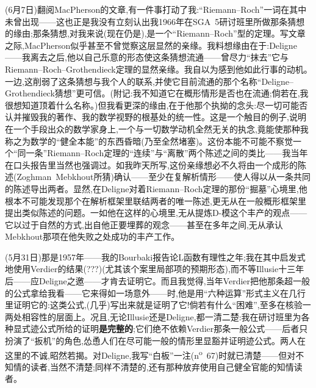 (6月7日)翻阅MacPherson的文章,有一件事打动了我:“Riemann--Roch”一词在其中未曾出现——这也正是我没有立刻认出我1966年在SGA~5研讨班里所做那条猜想的缘由;那条猜想,对我来说(现在仍是),是一个“Riemann--Roch”型的定理。写文章之际,MacPherson似乎甚至不曾觉察这层显然的亲缘。我料想缘由在于:Deligne——我离去之后,他以自己乐意的形态使这条猜想流通——曾尽力“抹去”它与Riemann--Roch--Grothendieck定理的显然亲缘。我自以为感到他如此行事的动机。一边,这削弱了这条猜想与我个人的联系,并使它目前流通的那个名称“Deligne--Grothendieck猜想”更可信。(附记:我不知道它在概形情形是否也在流通;倘若在,我很想知道顶着什么名称。)但我看更深的缘由,在于他那个执拗的念头:尽一切可能否认并摧毁我的著作、我的数学视野的根基处的统一性。这是一个触目的例子,说明在一个手段出众的数学家身上,一个与一切数学动机全然无关的执念,竟能使那种我称之为数学的“健全本能”的东西昏暗(乃至全然堵塞)。这份本能不可能不察觉一个“同一条”Riemann--Roch定理的“连续”与“离散”两个陈述之间的类比——我当年在口头报告里当然也强调过。如我昨天所写,这份亲缘想必不久将由一个成形的陈述(Zoghman~Mebkhout所猜)确认——至少在复解析情形——使人得以从一条共同的陈述导出两者。显然,在Deligne对着Riemann--Roch定理的那份“掘墓”心境里,他根本不可能发现那个在解析框架里联结两者的唯一陈述,更无从在一般概形框架里提出类似陈述的问题。一如他在这样的心境里,无从提炼D-模这个丰产的观点——它以过于自然的方式,出自他正要埋葬的观念——甚至在多年之间,无从承认Mebkhout那项在他失败之处成功的丰产工作。


(5月31日)那是1957年——我的Bourbaki报告论L函数有理性之年;我在其中启发式地使用Verdier的结果(???)(尤其该个案里局部项的预期形态),而不等Illusie十三年后——应Deligne之邀——才肯去证明它。而且我觉得,当年Verdier把他那条超\dmark{}一般的公式拿给我看——它来得如一场意外——时,他是用“六种运算”形式主义在几行里证明它的:这类公式,(几乎)写出来就是证明了它!倘若有什么“困难”,至多在核验一两处相容性的层面上。况且,无论Illusie还是Deligne,都一清二楚:我在研讨班里为各种显式迹公式所给的证明\textbf{是完整的};它们绝不依赖Verdier那条一般公式——后者只扮演了“扳机”的角色,怂恿人们在尽可能一般的情形里显豁并证明迹公式。两人在这里的不诚,昭然若揭。对Deligne,我写“白板”一注(n\textsuperscript{o}~67)时就已清楚——但对不知情的读者,当然不清楚;同样不清楚的,还有那种放弃使用自己健全官能的知情读者。

